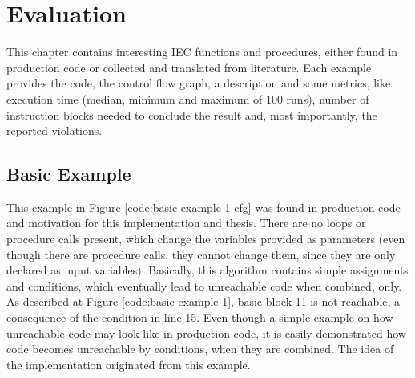 
\chapter {Evaluation}
\label {cha:evaluation}
This chapter contains interesting IEC functions and procedures, either found in production code or collected and translated from literature.
Each example provides the code, the control flow graph, a description and some metrics, like execution time (median, minimum and maximum of 100 runs), number of instruction blocks needed to conclude the result and, most importantly, the reported violations.


\section{Basic Example}
This example in Figure \ref{code:basic example 1 cfg} was found in production code and motivation for this implementation and thesis. There are no loops or procedure calls present, which change the variables provided as parameters (even though there are procedure calls, they cannot change them, since they are only declared as input variables).
Basically, this algorithm contains simple assignments and conditions, which eventually lead to unreachable code when combined, only.
As described at Figure \ref{code:basic example 1}, basic block 11 is not reachable, a consequence of the condition in line 15.
Even though a simple example on how unreachable code may look like in production code, it is easily demonstrated how code becomes unreachable by conditions, when they are combined.
The idea of the implementation originated from this example.



